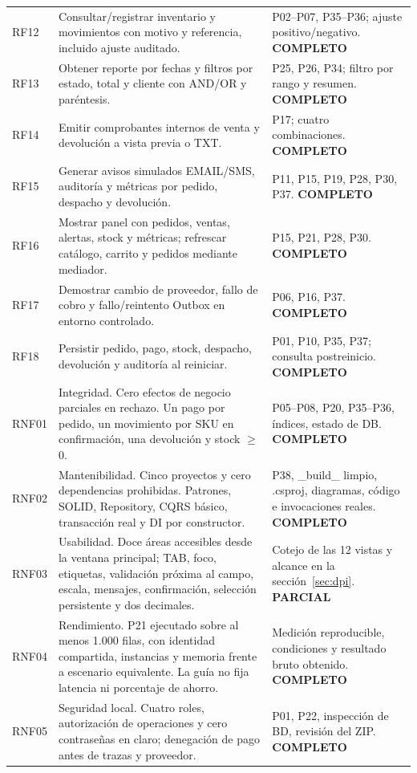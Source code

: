 \begin{longtable}{@{}L{.09\linewidth}L{.47\linewidth}L{.35\linewidth}@{}}
RF12 & Consultar/registrar inventario y movimientos con motivo y referencia, incluido ajuste auditado. & P02–P07, P35–P36; ajuste positivo/negativo. \textbf{COMPLETO} \\[2pt]
RF13 & Obtener reporte por fechas y filtros por estado, total y cliente con AND/OR y paréntesis. & P25, P26, P34; filtro por rango y resumen. \textbf{COMPLETO} \\[2pt]
RF14 & Emitir comprobantes internos de venta y devolución a vista previa o TXT. & P17; cuatro combinaciones. \textbf{COMPLETO} \\[2pt]
RF15 & Generar avisos simulados EMAIL/SMS, auditoría y métricas por pedido, despacho y devolución. & P11, P15, P19, P28, P30, P37. \textbf{COMPLETO} \\[2pt]
RF16 & Mostrar panel con pedidos, ventas, alertas, stock y métricas; refrescar catálogo, carrito y pedidos mediante mediador. & P15, P21, P28, P30. \textbf{COMPLETO} \\[2pt]
RF17 & Demostrar cambio de proveedor, fallo de cobro y fallo/reintento Outbox en entorno controlado. & P06, P16, P37. \textbf{COMPLETO} \\[2pt]
RF18 & Persistir pedido, pago, stock, despacho, devolución y auditoría al reiniciar. & P01, P10, P35, P37; consulta postreinicio. \textbf{COMPLETO} \\[2pt]
RNF01 & Integridad. Cero efectos de negocio parciales en rechazo. Un pago por pedido, un movimiento por SKU en confirmación, una devolución y stock $\ge$ 0. & P05–P08, P20, P35–P36, índices, estado de DB. \textbf{COMPLETO} \\[2pt]
RNF02 & Mantenibilidad. Cinco proyectos y cero dependencias prohibidas. Patrones, SOLID, Repository, CQRS básico, transacción real y DI por constructor. & P38, \_build\_ limpio, .csproj, diagramas, código e invocaciones reales. \textbf{COMPLETO} \\[2pt]
RNF03 & Usabilidad. Doce áreas accesibles desde la ventana principal; TAB, foco, etiquetas, validación próxima al campo, escala, mensajes, confirmación, selección persistente y dos decimales. & Cotejo de las 12 vistas y alcance en la sección~\ref{sec:dpi}. \textbf{PARCIAL} \\[2pt]
RNF04 & Rendimiento. P21 ejecutado sobre al menos 1.000 filas, con identidad compartida, instancias y memoria frente a escenario equivalente. La guía no fija latencia ni porcentaje de ahorro. & Medición reproducible, condiciones y resultado bruto obtenido. \textbf{COMPLETO} \\[2pt]
RNF05 & Seguridad local. Cuatro roles, autorización de operaciones y cero contraseñas en claro; denegación de pago antes de trazas y proveedor. & P01, P22, inspección de BD, revisión del ZIP. \textbf{COMPLETO} \\[2pt]

\end{longtable}
